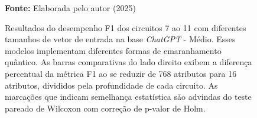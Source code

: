 \begin{figure}
\caption{Resultados do desempenho F1 dos circuitos 7 ao 11 com diferentes tamanhos de vetor de entrada na base \textit{ChatGPT} - Médio. Esses modelos implementam diferentes formas de emaranhamento quântico. As barras comparativas do lado direito exibem a diferença percentual da métrica F1 ao se reduzir de 768 atributos para 16 atributos, divididos pela profundidade de cada circuito. As marcações que indicam semelhança estatística são advindas do teste pareado de Wilcoxon com correção de p-valor de Holm.}
\label{fig:n_features:medium:g2}
     \centering
    \centering
      \par\medskip\ABNTEXfontereduzida\selectfont\textbf{Fonte:} Elaborada pelo autor (2025) \par\medskip
\end{figure}